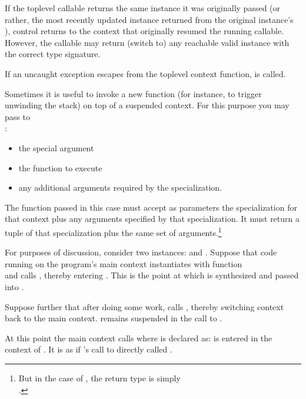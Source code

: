 If the toplevel callable returns the same \ectx instance it was originally
passed (or rather, the most recently updated instance returned from the
original instance's \op), control returns to the context that originally
resumed the running callable. However, the callable may return (switch to)
any reachable valid \ectx instance with the correct type signature.


If an uncaught exception escapes from the toplevel context function,
 is called.


Sometimes it is useful to invoke a new function (for instance, to trigger
unwinding the stack) on top of a suspended context. For this purpose you may
pass to\\
\ectxop:

\begin{itemize}
  \item the special argument 
  \item the function to execute
  \item any additional arguments required by the \ectx specialization.
\end{itemize}

The function passed in this case must accept as parameters the \ectx
specialization for that context plus any arguments specified by that
specialization. It must return a tuple of that \ectx specialization plus the
same set of arguments.\footnote{But in the case
of , the return type is
simply\\.}

For purposes of discussion, consider two 
instances:  and . Suppose that code running
on the program's main context instantiates  with function\\
 and calls , thereby
entering . This is the point at which  is synthesized
and passed into .

Suppose further that after doing some work,  calls ,
thereby switching context back to the main context.  remains
suspended in the call to .

At this point the main context calls 
where  is declared as:
\newline
{}
\newline
{} is entered in the context of . It is as if 's call
to  directly called .

